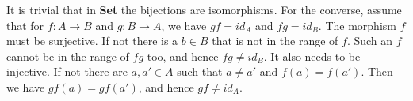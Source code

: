 It is trivial that in \textbf{Set} the bijections are isomorphisms. For the converse, assume that for $f:A\rightarrow B$ and $g:B\rightarrow A$, we have $gf=id_A$ and $fg=id_B$. The morphism $f$ must be surjective. If not there is a $b\in B$ that is not in the range of $f$. Such an $f$ cannot be in the range of $fg$ too, and hence $fg\neq id_B$. It also needs to be injective. If not there are $a,a'\in A$ such that $a\neq a'$ and $f(a)=f(a')$. Then we have $gf(a)=gf(a')$, and hence $gf\neq id_A$.
